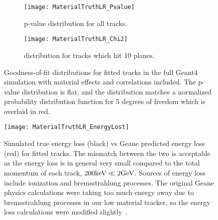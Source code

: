     \begin{figure}
    \centering
        \begin{subfigure}[t]{0.45\textwidth}
            \centering
            \texttt{[image: MaterialTruthLR\_Pvalue]}
            \caption{p-value distribution for all tracks.}
        \end{subfigure}
        \begin{subfigure}[t]{0.45\textwidth}
            \centering
            \texttt{[image: MaterialTruthLR\_Chi2]}
            \caption{\chisq distribution for tracks which hit 10 planes.}
        \end{subfigure}
    \caption[p-value and \chisq distribution for fitted tracks in the \gmtwo Geant4 simulation with material effects and correlations included]{Goodness-of-fit distributions for fitted tracks in the full \gmtwo Geant4 simulation with material effects and correlations included. The p-value distribution is flat, and the \chisq distribution matches a normalized \chisq probability distribution function for 5 degrees of freedom which is overlaid in red.}
    \label{fig:MaterialGoodnessOfFit}
    \end{figure}

    \begin{figure}[H]
      \centering
      \texttt{[image: MaterialTruthLR\_EnergyLost]}
        \caption[Simulated true energy loss vs Geane predicted energy loss for tracks]{Simulated true energy loss (black) vs Geane predicted energy loss (red) for fitted tracks. The mismatch between the two is acceptable as the energy loss is in general very small compared to the total momentum of each track, $200\text{k\text{e\kern-0.15ex V}} \ll 2 \text{G\text{e\kern-0.15ex V}}$. Sources of energy loss include ionization and bremsstrahlung processes. The original Geane physics calculations were taking too much energy away due to bremsstrahlung processes in our low material tracker, so the energy loss calculations were modified slightly~\cite{trackfittingdoc}.}
        \label{fig:EnergyLossComparison}
    \end{figure}


